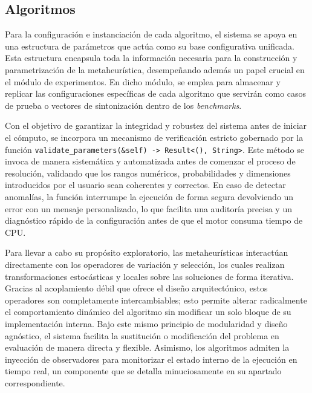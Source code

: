 \documentclass[12pt,a4paper,twoside,openright]{book}
\begin{document}
        
    \subsection{Algoritmos}
        Para la configuración e instanciación de cada algoritmo, el sistema se apoya en una estructura de parámetros que actúa como su base configurativa unificada. Esta estructura encapsula toda la información necesaria para la construcción y parametrización de la metaheurística, desempeñando además un papel crucial en el módulo de experimentos. En dicho módulo, se emplea para almacenar y replicar las configuraciones específicas de cada algoritmo que servirán como casos de prueba o vectores de sintonización dentro de los \textit{benchmarks}.

        Con el objetivo de garantizar la integridad y robustez del sistema antes de iniciar el cómputo, se incorpora un mecanismo de verificación estricto gobernado por la función \texttt{validate\_parameters(\&self) -> Result<(), String>}. Este método se invoca de manera sistemática y automatizada antes de comenzar el proceso de resolución, validando que los rangos numéricos, probabilidades y dimensiones introducidos por el usuario sean coherentes y correctos. En caso de detectar anomalías, la función interrumpe la ejecución de forma segura devolviendo un error con un mensaje personalizado, lo que facilita una auditoría precisa y un diagnóstico rápido de la configuración antes de que el motor consuma tiempo de CPU.

        Para llevar a cabo su propósito exploratorio, las metaheurísticas interactúan directamente con los operadores de variación y selección, los cuales realizan transformaciones estocásticas y locales sobre las soluciones de forma iterativa. Gracias al acoplamiento débil que ofrece el diseño arquitectónico, estos operadores son completamente intercambiables; esto permite alterar radicalmente el comportamiento dinámico del algoritmo sin modificar un solo bloque de su implementación interna. Bajo este mismo principio de modularidad y diseño agnóstico, el sistema facilita la sustitución o modificación del problema en evaluación de manera directa y flexible. Asimismo, los algoritmos admiten la inyección de observadores para monitorizar el estado interno de la ejecución en tiempo real, un componente que se detalla minuciosamente en su apartado correspondiente.
\end{document}
